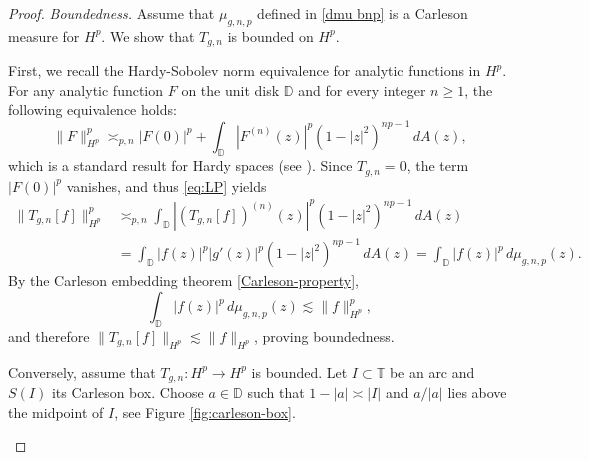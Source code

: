 \documentclass[preprint,12pt]{elsarticle}
\numberwithin{equation}{section}
\theoremstyle{remark}
\begin{document}
\begin{proof}
\textit{Boundedness.}
Assume that $ \mu_{g,n,p} $ defined in \eqref{dmu bnp} is a Carleson measure for $ H^p $. We show that $ T_{g,n} $ is bounded on $ H^p $.

First, we recall the Hardy-Sobolev norm equivalence for analytic functions in $ H^p $. For any analytic function $ F $ on the unit disk $ \mathbb{D} $ and for every integer $ n \geq 1 $, the following equivalence holds:
\begin{equation}\label{eq:LP}
\|F\|_{H^p}^p \asymp_{p,n} |F(0)|^p + \int_{\mathbb{D}} |F^{(n)}(z)|^p (1 - |z|^2)^{np - 1} \, dA(z),
\end{equation}
which is a standard result for Hardy spaces (see \cite[Proposition 6.2]{Zhu2005}). Since $T_{g,n}=0$, the term $|F(0)|^p$ vanishes, and thus \eqref{eq:LP} yields
\begin{align*}
\|T_{g,n}[f]\|_{H^p}^p
&\asymp_{p,n}
\int_{\mathbb D} |(T_{g,n}[f])^{(n)}(z)|^p (1-|z|^2)^{np-1}\,dA(z)\\
&=
\int_{\mathbb D} |f(z)|^p |g'(z)|^p (1-|z|^2)^{np-1}\,dA(z)
=\int_{\mathbb D}|f(z)|^p\,d\mu_{g,n,p}(z).
\end{align*}
By the Carleson embedding theorem \eqref{Carleson-property},
\begin{equation*}
\int_{\mathbb D}|f(z)|^p\,d\mu_{g,n,p}(z)\lesssim \|f\|_{H^p}^p,
\end{equation*}
and therefore $\|T_{g,n}[f]\|_{H^p}\lesssim \|f\|_{H^p}$, proving boundedness.

Conversely, assume that $T_{g,n}:H^p\to H^p$ is bounded. Let $I\subset\mathbb T$ be an arc and $S(I)$ its Carleson box.
Choose $a\in\mathbb D$ such that $1-|a|\asymp |I|$ and $a/|a|$ lies above the midpoint of $I$, see Figure \ref{fig:carleson-box}.

\begin{figure}
    \centering
{}
\end{figure}
\end{proof}
\end{document}
